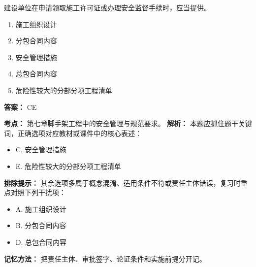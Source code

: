 \documentclass[UTF8,fontset=fandol,11pt]{ctexart}
\begin{document}
\begin{quizbox}[title={第 2 题}]
建设单位在申请领取施工许可证或办理安全监督手续时，应当提供。\\
\begin{enumerate}[label=\Alph*.]
\item 施工组织设计
\item 分包合同内容
\item 安全管理措施
\item 总包合同内容
\item 危险性较大的分部分项工程清单
\end{enumerate}
\textbf{答案：} CE
\vspace{0.25em}
\begin{answerbox}[title={考点解析}]
\textbf{考点：} 第七章脚手架工程中的安全管理与规范要求。
\textbf{解析：} 本题应抓住题干关键词，正确选项对应教材或课件中的核心表述：
\begin{itemize}
\item C. 安全管理措施
\item E. 危险性较大的分部分项工程清单
\end{itemize}
\textbf{排除提示：} 其余选项多属于概念混淆、适用条件不符或责任主体错误，复习时重点对照下列干扰项：
\begin{itemize}
\item A. 施工组织设计
\item B. 分包合同内容
\item D. 总包合同内容
\end{itemize}
\textbf{记忆方法：} 把责任主体、审批签字、论证条件和实施前提分开记。
\end{answerbox}
\end{quizbox}

\vspace{0.2em}
\end{document}
